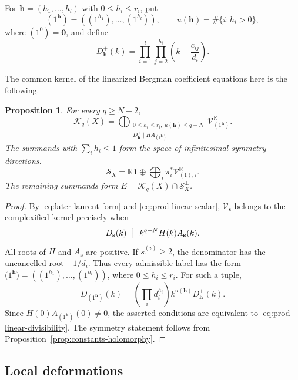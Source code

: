 \documentclass[11pt,reqno]{amsart}
\theoremstyle{corollary}
\theoremstyle{conjecture}
\theoremstyle{assumption}
\theoremstyle{proposition}
\newtheorem{proposition}[theorem]{Proposition}
\theoremstyle{remark}
\numberwithin{equation}{section}
\begin{document}
For $\mathbf h=(h_1,\ldots,h_l)$ with $0\leq h_i\leq r_i$, put
\[
 (1^{\mathbf h})=((1^{h_1}),\ldots,(1^{h_l})),\qquad u(\mathbf h)=\#\{i\colon h_i>0\},
\]
where $(1^0)=\mathbf0$, and define
\[
 D_{\mathbf h}^{+}(k)=\prod_{i=1}^{l}\prod_{j=2}^{h_i}\left(k-\frac{c_{ij}}{d_i}\right).
\]

The common kernel of the linearized Bergman coefficient equations here is the following.
\begin{proposition}\label{prop:prod-linear-kernel}
For every $q\geq N+2$,
\[
 \mathcal K_q(X)=\bigoplus_{\substack{0\leq h_i\leq r_i,\ u(\mathbf h)\leq q-N\\D_{\mathbf h}^{+}\mid H A_{(1^{\mathbf h})}}}\mathcal V_{(1^{\mathbf h})}^{\mathbb R}.
\]
The summands with $\sum_i h_i\leq 1$ form the space of infinitesimal symmetry directions.
\[
\mathcal S_X=\mathbb R\mathbf1\oplus \bigoplus_i\pi_i^*\mathcal V_{(1),i}^{\mathbb R}.
\]
The remaining summands form $E=\mathcal K_q(X)\cap\mathcal S_X^\perp$.
\end{proposition}

\begin{proof}
By \eqref{eq:later-laurent-form} and \eqref{eq:prod-linear-scalar}, $\mathcal V_{\mathbf s}$ belongs to the complexified kernel precisely when 
\begin{equation}\label{eq:prod-linear-divisibility}
D_{\mathbf s}(k)\ \bigm|\ k^{q-N}H(k)A_{\mathbf s}(k).
\end{equation}
All roots of $H$ and $A_{\mathbf s}$ are positive. If $s_1^{(i)}\geq2$, the denominator has the uncancelled root $-1/d_i$. Thus every admissible label has the form ${(1^\mathbf h})=((1^{h_1}),\ldots,(1^{h_l}))$, where $0\leq h_i\leq r_i$. For such a tuple,
\[
 D_{(1^{\mathbf h})}(k)=\left(\prod_i d_i^{h_i}\right)k^{u(\mathbf h)}D_{\mathbf h}^{+}(k).
\]
Since $H(0)A_{(1^{\mathbf h})}(0)\neq 0$, the asserted conditions are equivalent to \eqref{eq:prod-linear-divisibility}. The symmetry statement follows from Proposition~\ref{prop:constants-holomorphy}.
\end{proof}

\subsection{Local deformations}
\end{document}
